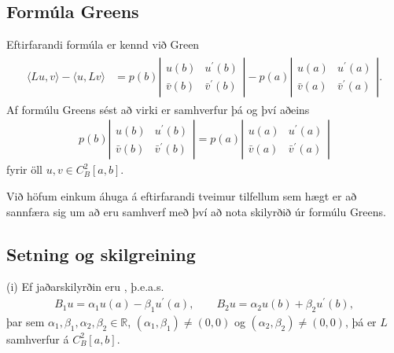 \documentclass[a4paper,10pt,icelandic]{sphinxmanual}
\begin{document}
\subsection{Formúla Greens}
\label{\detokenize{Kafli03:formula-greens}}
Eftirfarandi formúla er kennd við Green
\begin{equation*}
\begin{split}\begin{aligned}
 {{\langle Lu,v\rangle}} -{{\langle u,Lv\rangle}}    &=p(b)\left|
 \begin{matrix} u(b) & u{{^{\prime}}}(b) \\ \bar v(b) &\bar v{{^{\prime}}}(b)
 \end{matrix}\right| -
 p(a)\left|
 \begin{matrix} u(a) & u{{^{\prime}}}(a) \\ \bar v(a) &\bar v{{^{\prime}}}(a)
 \end{matrix}\right|.\nonumber\end{aligned}\end{split}
\end{equation*}
Af formúlu Greens sést að virki er samhverfur þá og því aðeins
\begin{equation*}
\begin{split}p(b)\left|
\begin{matrix} u(b) & u{{^{\prime}}}(b) \\ \bar v(b) &\bar v{{^{\prime}}}(b)
\end{matrix}\right| =
p(a)\left|
\begin{matrix} u(a) & u{{^{\prime}}}(a) \\ \bar v(a) &\bar v{{^{\prime}}}(a)
\end{matrix}\right|\end{split}
\end{equation*}
fyrir öll \(u,v\in C^2_B[a,b]\).

Við höfum einkum áhuga á eftirfarandi tveimur tilfellum sem hægt er að sannfæra sig um að eru samhverf með því að nota skilyrðið úr formúlu Greens.


\subsection{Setning og skilgreining}
\label{\detokenize{Kafli03:setning-og-skilgreining}}
(i) Ef jaðarskilyrðin eru , þ.e.a.s.
\begin{equation*}
\begin{split}B_1u=\alpha_1u(a)-\beta_1u{{^{\prime}}}(a), \qquad
 B_2u=\alpha_2u(b)+\beta_2u{{^{\prime}}}(b),\end{split}
\end{equation*}
þar sem \(\alpha_1, \beta_1, \alpha_2, \beta_2\in {{\mathbb  R}}\),
\((\alpha_1,\beta_1)\neq (0,0)\) og \((\alpha_2,\beta_2)\neq (0,0)\), þá er \(L\) samhverfur á \(C^2_B[a,b]\).
\end{document}
